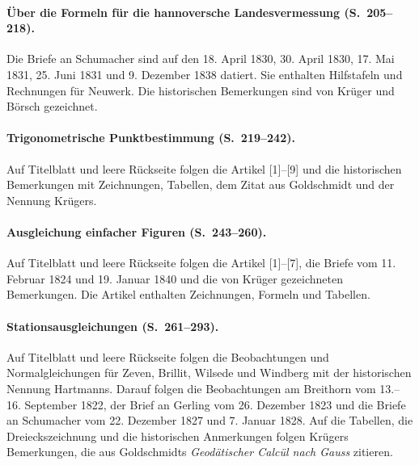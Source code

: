 \paragraph{Über die Formeln für die hannoversche Landesvermessung (S.~205--218).}
Die Briefe an Schumacher sind auf den 18. April 1830, 30. April 1830, 17. Mai 1831, 25. Juni 1831 und 9. Dezember 1838 datiert. Sie enthalten Hilfstafeln und Rechnungen für Neuwerk. Die historischen Bemerkungen sind von Krüger und Börsch gezeichnet.

\paragraph{Trigonometrische Punktbestimmung (S.~219--242).}
Auf Titelblatt und leere Rückseite folgen die Artikel [1]--[9] und die historischen Bemerkungen mit Zeichnungen, Tabellen, dem Zitat aus Goldschmidt und der Nennung Krügers.

\paragraph{Ausgleichung einfacher Figuren (S.~243--260).}
Auf Titelblatt und leere Rückseite folgen die Artikel [1]--[7], die Briefe vom 11. Februar 1824 und 19. Januar 1840 und die von Krüger gezeichneten Bemerkungen. Die Artikel enthalten Zeichnungen, Formeln und Tabellen.

\paragraph{Stationsausgleichungen (S.~261--293).}
Auf Titelblatt und leere Rückseite folgen die Beobachtungen und Normalgleichungen für Zeven, Brillit, Wilsede und Windberg mit der historischen Nennung Hartmanns. Darauf folgen die Beobachtungen am Breithorn vom 13.--16. September 1822, der Brief an Gerling vom 26. Dezember 1823 und die Briefe an Schumacher vom 22. Dezember 1827 und 7. Januar 1828. Auf die Tabellen, die Dreieckszeichnung und die historischen Anmerkungen folgen Krügers Bemerkungen, die aus Goldschmidts \textit{Geodätischer Calcül nach Gauss} zitieren.

